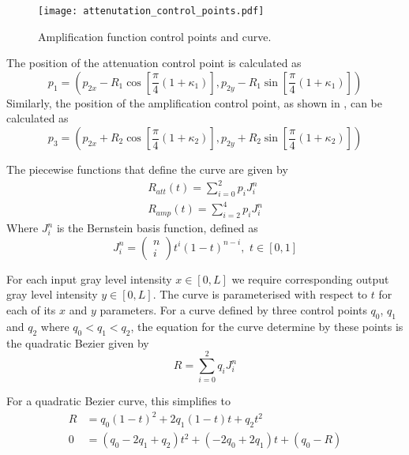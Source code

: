 \begin{definition}
\begin{figure}[!t]
{			\texttt{[image: attenutation\_control\_points.pdf]}
			\label{fig:ampcontrolpoints}
		}	
		\caption{Amplification function control points and curve.}
		\label{fig:ampcalculation}
	\end{figure}

	The position of the attenuation control point is calculated as
	\begin{equation*}
		{p_1} = \left(
		p_{2x} - R_1\cos[\frac{\pi}{4}(1+\kappa_1)],
		p_{2y} - R_1\sin[\frac{\pi}{4}(1+\kappa_1)]
		\right)
	\end{equation*}
	Similarly, the position of the amplification control point, as shown in , can be calculated as
	\begin{equation*}
		{p_3} = \left(
		p_{2x} + R_2\cos[\frac{\pi}{4}(1+\kappa_2)],
		p_{2y} + R_2\sin[\frac{\pi}{4}(1+\kappa_2)]
		\right)
	\end{equation*}
	
	The piecewise functions that define the curve are given by	
	\begin{eqnarray}
		R_{att}(t) = \sum_{i=0}^2 p_i J_i^n \\
		R_{amp}(t) = \sum_{i=2}^4 p_i J_i^n
	\end{eqnarray}
	Where $J_i^n$ is the Bernstein basis function, defined as
	\begin{equation}
	J_i^n = \begin{pmatrix}
	n \\
	i
	\end{pmatrix}	
	t^i(1-t)^{n-i}, \,\, t \in [0,1]
	\label{eq:bernsteinbasis}
	\end{equation}
	
	For each input gray level intensity $x \in [0, L]$ we require corresponding output gray level intensity $y \in [0, L]$.
	The curve is parameterised with respect to $t$ for each of its $x$ and $y$ parameters.
	For a curve defined by three control points $q_0$, $q_1$ and $q_2$ where $q_0 < q_1 < q_2$, the equation for the curve determine by these points is the quadratic Bezier given by
	\begin{equation}
		R = \sum_{i=0}^2 q_i J_i^n
	\end{equation}
	
	For a quadratic Bezier curve, this simplifies to
	\begin{align*}
		R &= q_0(1-t)^2 + 2q_1(1-t)t + q_2t^2 \\
		0 &= (q_0-2q_1+q_2)t^2 + (-2q_0+2q_1)t + (q_0-R)
	\end{align*}
	

\end{definition}
